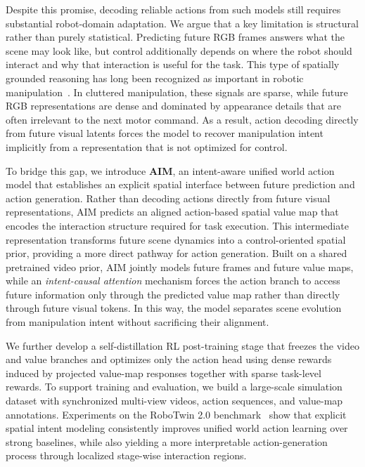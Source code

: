 \documentclass{article}
\newcommand{\method}{AIM\xspace}
\begin{document}
Despite this promise, decoding reliable actions from such models still requires substantial robot-domain adaptation. We argue that a key limitation is structural rather than purely statistical. Predicting future RGB frames answers what the scene may look like, but control additionally depends on where the robot should interact and why that interaction is useful for the task. This type of spatially grounded reasoning has long been recognized as important in robotic manipulation~\cite{shridhar2022cliport,mo2021where2act,shridhar2023peract,wi2023calamari}. In cluttered manipulation, these signals are sparse, while future RGB representations are dense and dominated by appearance details that are often irrelevant to the next motor command. As a result, action decoding directly from future visual latents forces the model to recover manipulation intent implicitly from a representation that is not optimized for control.

To bridge this gap, we introduce \textbf{\method}, an intent-aware unified world action model that establishes an explicit spatial interface between future prediction and action generation. Rather than decoding actions directly from future visual representations, \method predicts an aligned action-based spatial value map that encodes the interaction structure required for task execution. This intermediate representation transforms future scene dynamics into a control-oriented spatial prior, providing a more direct pathway for action generation. Built on a shared pretrained video prior, \method jointly models future frames and future value maps, while an \emph{intent-causal attention} mechanism forces the action branch to access future information only through the predicted value map rather than directly through future visual tokens. In this way, the model separates scene evolution from manipulation intent without sacrificing their alignment.

We further develop a self-distillation RL post-training stage that freezes the video and value branches and optimizes only the action head using dense rewards induced by projected value-map responses together with sparse task-level rewards. To support training and evaluation, we build a large-scale simulation dataset with synchronized multi-view videos, action sequences, and value-map annotations. Experiments on the RoboTwin 2.0 benchmark~\cite{robotwin2.0} show that explicit spatial intent modeling consistently improves unified world action learning over strong baselines, while also yielding a more interpretable action-generation process through localized stage-wise interaction regions.
\end{document}
